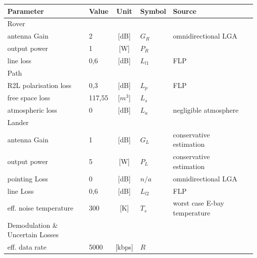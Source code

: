 \begin{table}[h]
\centering
\begin{tabular}{llclll}
\hline
Parameter                        & Value  & Unit	       & Symbol        & Source                       &  \\ \hline
Rover                            &        &            &               &                              &  \\ \hline\hline
antenna Gain           		     & 2      & {[}dB{]}   & ${G}_{R}$  	   & omnidirectional LGA          &  \\
output power        	         & 1      & {[}W{]}    & ${P}_{R}$  	   &                              &  \\
line loss               	     & 0,6    & {[}dB{]}   & ${L}_{l1}$ 	   & FLP                          &  \\ \hline
Path                             &        &            &               &                              &  \\ \hline\hline
R2L polarisation loss            & 0,3    & {[}dB{]}   & ${L}_{p}$ 	   & FLP                          &  \\
free space loss                  & 117,55 & {[}$m^3${]}& ${L}_{s}$  	   &                              &  \\
atmospheric loss                 & 0      & {[}dB{]}   & ${L}_{a}$	   & negligible atmosphere        &  \\ \hline
Lander                           &        &            &               &                              &  \\ \hline\hline
antenna Gain             		 & 1      & {[}dB{]}   & ${G}_{L}$	   & conservative estimation      &  \\
output power        	         & 5      & {[}W{]}    & ${P}_{L}$  	   & conservative estimation      &  \\
pointing Loss  		             & 0      & {[}dB{]}   & ${n/a}$       & omnidirectional LGA          &  \\
line Loss  		                 & 0,6    & {[}dB{]}   & ${L}_{l2}$	   & FLP                          &  \\
eff. noise temperature           & 300    & {[}K{]}    & ${T}_{s}$	   & worst case E-bay temperature &  \\ \hline
Demodulation \& Uncertain Losses &        &            &               &                              &  \\ \hline\hline
eff. data rate                   & 5000   & {[}kbps{]} & ${R}$         &                              &  \\

\end{tabular}
\end{table}
